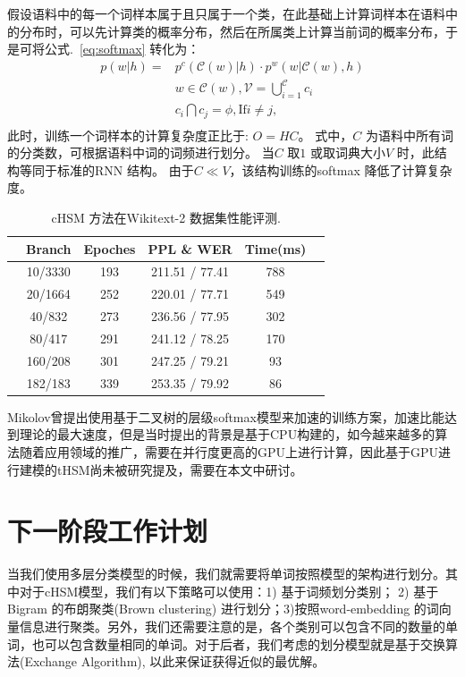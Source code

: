 \documentclass[twoside,UTF8,AutoFakeBold]{buaathesis}
\begin{document}
假设语料中的每一个词样本属于且只属于一个类，在此基础上计算词样本在语料中的分布时，可以先计算类的概率分布，然后在所属类上计算当前词的概率分布，于是可将公式.~\ref{eq:softmax} 转化为：
  \begin{equation}
  \begin{split}
p(w|h)=&p^c(\mathcal{C}(w)|h)\cdot p^w(w|\mathcal{C}(w),h) \\
& w\in \mathcal{C}(w),\mathcal{V}=\bigcup _{i = 1}^\mathcal{C}{c_i} \\
&c_i \bigcap c_j=\phi, \text{If} i\ne j, \\
\end{split}
\end{equation}
此时，训练一个词样本的计算复杂度正比于: $O =HC$。 式中，$C$ 为语料中所有词的分类数，可根据语料中词的词频进行划分。 当$C$ 取$1$ 或取词典大小$V$ 时，此结构等同于标准的RNN 结构。 由于$C \ll V$，该结构训练的softmax 降低了计算复杂度。

\begin{table}
  \centering
  \caption{cHSM 方法在Wikitext-2 数据集性能评测.\label{table:clustering}}
  \begin{tabular}{lccccc} \toprule
  &Branch& Epoches& PPL \& WER &Time(ms)\\\midrule
  &10/3330&193&211.51 / 77.41 &788\\
  &20/1664&252&220.01 / 77.71&549\\
  &40/832&273&236.56 / 77.95&302\\
  &80/417&291& 241.12 / 78.25&170\\
  &160/208&301&247.25 / 79.21&93\\
  &182/183&339&253.35 / 79.92&86\\
\bottomrule
\end{tabular}
\end{table}


Mikolov曾提出使用基于二叉树的层级softmax模型来加速的训练方案，加速比能达到理论的最大速度，但是当时提出的背景是基于CPU构建的，如今越来越多的算法随着应用领域的推广，需要在并行度更高的GPU上进行计算，因此基于GPU进行建模的tHSM尚未被研究提及，需要在本文中研讨。
\section{下一阶段工作计划}
当我们使用多层分类模型的时候，我们就需要将单词按照模型的架构进行划分。其中对于cHSM模型，我们有以下策略可以使用：1) 基于词频划分类别； 2) 基于Bigram 的布朗聚类(Brown clustering) 进行划分；3)按照word-embedding 的词向量信息进行聚类。另外，我们还需要注意的是，各个类别可以包含不同的数量的单词，也可以包含数量相同的单词。对于后者，我们考虑的划分模型就是基于交换算法(Exchange Algorithm), 以此来保证获得近似的最优解。
\end{document}
